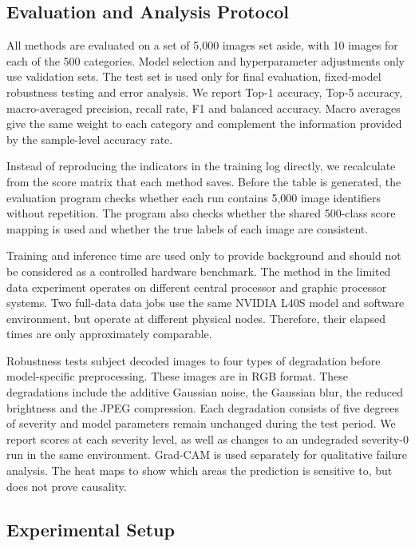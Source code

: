\subsection{Evaluation and Analysis Protocol}
\label{sec:evaluation_protocol}

All methods are evaluated on a set of 5,000 images set aside, with 10 images
for each of the 500 categories. Model selection and hyperparameter adjustments
only use validation sets. The test set is used only for final evaluation,
fixed-model robustness testing and error analysis. We report Top-1 accuracy,
Top-5 accuracy, macro-averaged precision, recall rate, F1 and balanced
accuracy. Macro averages give the same weight to each category and complement
the information provided by the sample-level accuracy rate.

Instead of reproducing the indicators in the training log directly, we
recalculate from the score matrix that each method saves. Before the table is
generated, the evaluation program checks whether each run contains 5,000 image
identifiers without repetition. The program also checks whether the shared
500-class score mapping is used and whether the true labels of each image are
consistent.

Training and inference time are used only to provide background and should not
be considered as a controlled hardware benchmark. The method in the limited
data experiment operates on different central processor and graphic processor
systems. Two full-data data jobs use the same NVIDIA L40S model and software
environment, but operate at different physical nodes. Therefore, their elapsed
times are only approximately comparable.

Robustness tests subject decoded images to four types of degradation before
model-specific preprocessing. These images are in RGB format. These
degradations include the additive Gaussian noise, the Gaussian blur, the
reduced brightness and the JPEG compression. Each degradation consists of five
degrees of severity and model parameters remain unchanged during the test
period. We report scores at each severity level, as well as changes to an
undegraded severity-0 run in the same environment. Grad-CAM is used separately
for qualitative failure analysis. The heat maps to show which areas the
prediction is sensitive to, but does not prove causality.

\subsection{Experimental Setup}
\label{sec:experimental_setup}

